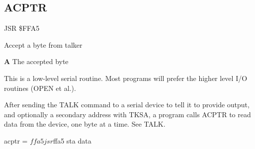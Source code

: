 \subsection{ACPTR}
\label{KERNAL Jump Table!ACPTR}
\begin{description}[leftmargin=2cm,style=nextline]
    \item [Address:] JSR \$FFA5
    \item [Description:] Accept a byte from talker
    \item [Outputs:]
        \textbf{A} The accepted byte
    \item [Remarks:]
        This is a low-level serial routine. Most programs will prefer the higher level I/O routines (OPEN et al.).

        After sending the TALK command to a serial device to tell it to provide output, and optionally a secondary address with TKSA, a program calls ACPTR to read data from the device, one byte at a time. See TALK.
    \item [Example:]
        \begin{asmcode}
acptr = $ffa5

    jsr $ffa5
    sta data
        \end{asmcode}
\end{description}



\newpage
